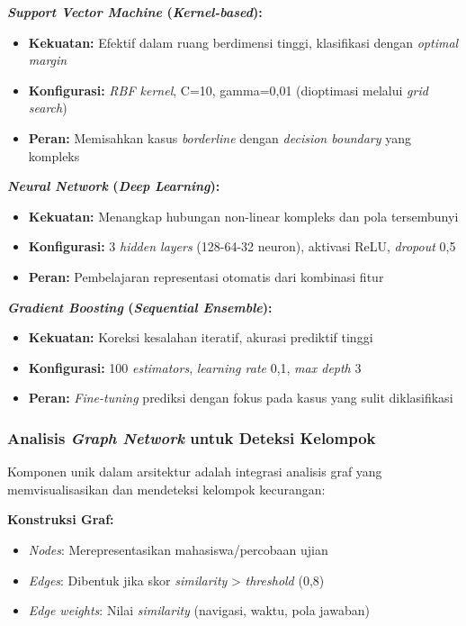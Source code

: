 \textbf{\textit{Support Vector Machine} (\textit{Kernel-based}):}
\begin{itemize}
    \item \textbf{Kekuatan:} Efektif dalam ruang berdimensi tinggi, klasifikasi dengan \textit{optimal margin}
    \item \textbf{Konfigurasi:} \textit{RBF kernel}, C=10, gamma=0,01 (dioptimasi melalui \textit{grid search})
    \item \textbf{Peran:} Memisahkan kasus \textit{borderline} dengan \textit{decision boundary} yang kompleks
\end{itemize}

\textbf{\textit{Neural Network} (\textit{Deep Learning}):}
\begin{itemize}
    \item \textbf{Kekuatan:} Menangkap hubungan non-linear kompleks dan pola tersembunyi
    \item \textbf{Konfigurasi:} 3 \textit{hidden layers} (128-64-32 neuron), aktivasi ReLU, \textit{dropout} 0,5
    \item \textbf{Peran:} Pembelajaran representasi otomatis dari kombinasi fitur
\end{itemize}

\textbf{\textit{Gradient Boosting} (\textit{Sequential Ensemble}):}
\begin{itemize}
    \item \textbf{Kekuatan:} Koreksi kesalahan iteratif, akurasi prediktif tinggi
    \item \textbf{Konfigurasi:} 100 \textit{estimators}, \textit{learning rate} 0,1, \textit{max depth} 3
    \item \textbf{Peran:} \textit{Fine-tuning} prediksi dengan fokus pada kasus yang sulit diklasifikasi
\end{itemize}

\subsubsection{Analisis \textit{Graph Network} untuk Deteksi Kelompok}
\label{sec:graphNetworkAnalysis}

Komponen unik dalam arsitektur adalah integrasi analisis graf yang memvisualisasikan dan mendeteksi kelompok kecurangan:

\textbf{Konstruksi Graf:}
\begin{itemize}
    \item \textit{Nodes}: Merepresentasikan mahasiswa/percobaan ujian
    \item \textit{Edges}: Dibentuk jika skor \textit{similarity} > \textit{threshold} (0,8)
    \item \textit{Edge weights}: Nilai \textit{similarity} (navigasi, waktu, pola jawaban)
\end{itemize}

